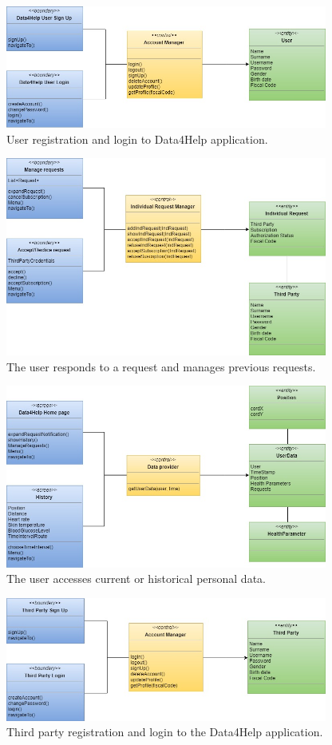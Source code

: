 \begin{figure}[ht]
    \centering
    \includegraphics[width=300pt]{images/BCE/BCE_Diagrams1.jpg}
    \caption{User registration and login to Data4Help application.}
    \label{BCE1}
\end{figure}
\begin{figure}[ht]
    \centering
    \includegraphics[width=300pt]{images/BCE/BCE_Diagrams2.jpg}
    \caption{The user responds to a request and manages previous requests.}
    \label{BCE2}
\end{figure}
\begin{figure}[ht]
    \centering
    \includegraphics[width=300pt]{images/BCE/BCE_Diagrams3.jpg}
    \caption{The user accesses current or historical personal data.}
    \label{BCE3}
\end{figure}
\begin{figure}[ht]
    \centering
    \includegraphics[width=300pt]{images/BCE/BCE_Diagrams4.jpg}
    \caption{Third party registration and login to the Data4Help application.}
    \label{BCE4}
\end{figure}
